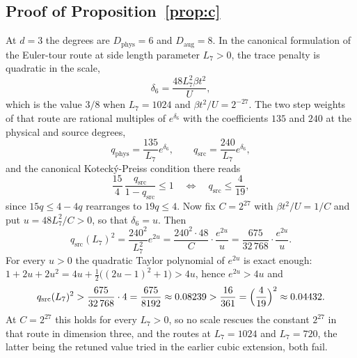 \documentclass[11pt]{article}
\theoremstyle{plain}
\theoremstyle{definition}
\newcommand{\Dphys}{D_{\mathrm{phys}}}
\newcommand{\Daug}{D_{\mathrm{aug}}}
\begin{document}
\subsection{Proof of Proposition~\ref{prop:c}}\label{sec:propc}

At $d=3$ the degrees are $\Dphys=6$ and $\Daug=8$. In the canonical formulation of
the Euler-tour route at side length parameter $L_7>0$, the trace penalty is quadratic
in the scale,
\begin{equation}\label{eq:d6}
 \delta_6=\frac{48L_7^2\beta t^2}{U},
\end{equation}
which is the value $3/8$ when $L_7=1024$ and $\beta t^2/U=2^{-27}$. The two step
weights of that route are rational multiples of $e^{\delta_6}$ with the coefficients
$135$ and $240$ at the physical and source degrees,
\begin{equation}\label{eq:qroutes}
 q_{\mathrm{phys}}=\frac{135}{L_7}e^{\delta_6},\qquad
 q_{\mathrm{src}}=\frac{240}{L_7}e^{\delta_6},
\end{equation}
and the canonical Koteck\'y-Preiss condition there reads
\begin{equation}\label{eq:canKP}
 \frac{15}{4}\,\frac{q_{\mathrm{src}}}{1-q_{\mathrm{src}}}\le1
 \quad\Longleftrightarrow\quad q_{\mathrm{src}}\le\frac{4}{19},
\end{equation}
since $15q\le4-4q$ rearranges to $19q\le4$. Now fix $C=2^{27}$ with
$\beta t^2/U=1/C$ and put $u=48L_7^2/C>0$, so that $\delta_6=u$. Then
\begin{equation}\label{eq:qsq}
 q_{\mathrm{src}}(L_7)^2=\frac{240^2}{L_7^2}e^{2u}
 =\frac{240^2\cdot48}{C}\cdot\frac{e^{2u}}{u}
 =\frac{675}{32\,768}\cdot\frac{e^{2u}}{u}.
\end{equation}
For every $u>0$ the quadratic Taylor polynomial of $e^{2u}$ is exact enough:
$1+2u+2u^2=4u+\frac12\bigl((2u-1)^2+1\bigr)>4u$, hence $e^{2u}>4u$ and
\begin{equation}\label{eq:lowerq}
 q_{\mathrm{src}}(L_7)^2>\frac{675}{32\,768}\cdot4=\frac{675}{8192}
 \approx0.08239>\frac{16}{361}=\Bigl(\frac4{19}\Bigr)^2\approx0.04432 .
\end{equation}
At $C=2^{27}$ this holds for every $L_7>0$, so no scale rescues the constant
$2^{27}$ in that route in dimension three, and the routes at $L_7=1024$ and
$L_7=720$, the latter being the retuned value tried in the earlier cubic extension,
both fail.
\end{document}

